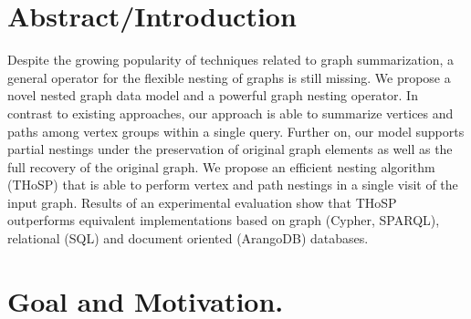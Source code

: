 \documentclass[a0,portrait]{a0poster}
\begin{document}
\begin{multicols}{2} %


\color{Navy} %




\color{SaddleBrown} %

\section*{Abstract/Introduction}

 Despite the growing popularity of techniques related to graph summarization, a general operator for the flexible nesting of graphs is still missing.
We propose a novel nested graph data model and a powerful graph nesting operator. In contrast to existing approaches, our approach is able to summarize vertices and paths among vertex groups within a single query. Further on, our model supports partial nestings under the preservation of original graph elements as well as the full recovery of the original graph. We propose an efficient nesting algorithm (THoSP) that is able to perform vertex and path nestings in a single visit of the input graph. Results of an experimental evaluation show that THoSP outperforms equivalent implementations based on graph (Cypher, SPARQL), relational (SQL) and document oriented (ArangoDB) databases.


\color{DarkSlateGray} %

\section*{Goal and Motivation.}


\end{multicols}
\end{document}
